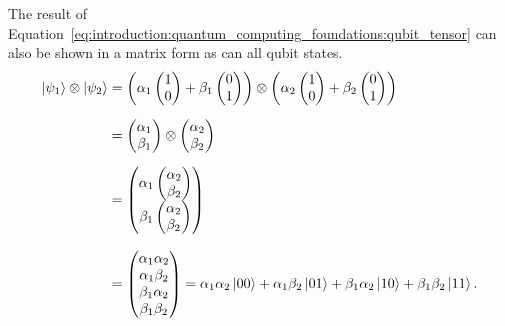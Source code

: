 The result of Equation~\ref{eq:introduction:quantum_computing_foundations:qubit_tensor} can also be shown in a matrix form as can all qubit states.
\[
    \begin{aligned}
        \ket{\psi_{1}} \otimes \ket{\psi_{2}}
        &=
        \left(
            \alpha_{1}
            \begin{pmatrix}
                1\\
                0
            \end{pmatrix}
            +
            \beta_{1}
            \begin{pmatrix}
                0\\
                1
            \end{pmatrix}
        \right)
        \otimes
        \left(
            \alpha_{2}
            \begin{pmatrix}
                1\\
                0
            \end{pmatrix}
            +
            \beta_{2}
            \begin{pmatrix}
                0\\
                1
            \end{pmatrix}
        \right)\\[6pt]
        &=
        \begin{pmatrix}
            \alpha_{1}\\
            \beta_{1}
        \end{pmatrix}
        \otimes
        \begin{pmatrix}
            \alpha_{2}\\
            \beta_{2}
        \end{pmatrix}\\[6pt]
        &=
        \begin{pmatrix}
            \alpha_{1}\begin{pmatrix}\alpha_{2}\\ \beta_{2}\end{pmatrix}\\[6pt]
            \beta_{1}\begin{pmatrix}\alpha_{2}\\ \beta_{2}\end{pmatrix}
        \end{pmatrix}\\[8pt]
        &=
        \begin{pmatrix}
            \alpha_{1}\alpha_{2}\\
            \alpha_{1}\beta_{2}\\
            \beta_{1}\alpha_{2}\\
            \beta_{1}\beta_{2}
        \end{pmatrix}
        =
        \alpha_{1}\alpha_{2}\ket{00}
        +\alpha_{1}\beta_{2}\ket{01}
        +\beta_{1}\alpha_{2}\ket{10}
        +\beta_{1}\beta_{2}\ket{11}.
    \end{aligned}
\]

